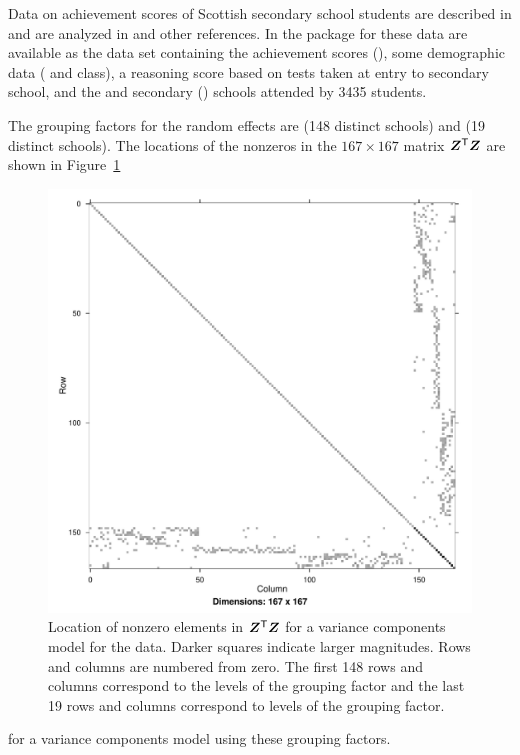 \documentclass[12pt]{article}
\begin{document}
Data on achievement scores of Scottish secondary school students are
described in \citet{Paterson:1991} and are analyzed in
\citet[ch.~18]{MLwiN:2002} and other references.  In the 
package for \RR{} these data are available as the data set
 containing the achievement scores (), some
demographic data ( and  class), a 
reasoning score based on tests taken at entry to secondary school, and
the  and secondary () schools attended by
3435 students.

The grouping factors for the random effects are  (148
distinct schools) and  (19 distinct schools).  
The locations of the nonzeros in the $167\times 167$ matrix
$\bm{Z}^\mathsf{T}\bm{Z}$ are shown in Figure~\ref{fig:ZtZ}
\begin{figure}[tbp]
  \centering
{}
\includegraphics{MixedEffects-FigZtZ}
\caption{Location of nonzero elements in
  $\bm{Z}^\mathsf{T}\bm{Z}$ for a variance components model for the
   data.  Darker squares indicate larger magnitudes.
  Rows and columns are numbered from zero.  The first 148 rows and
  columns correspond to the levels of the  grouping
  factor and the last 19 rows and columns correspond to levels of the
   grouping factor.}
  \label{fig:ZtZ}
\end{figure}
for a variance components model using these grouping factors.
\end{document}
